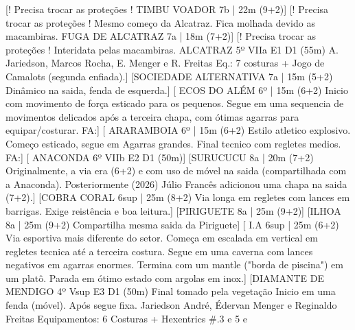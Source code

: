 
\begin{CGSectorRoutes}
    [! Precisa trocar as proteções ! TIMBU VOADOR 7b | 22m (9+2)]
    [! Precisa trocar as proteções ! Mesmo começo da Alcatraz. Fica molhada devido as macambiras. FUGA DE ALCATRAZ 7a | 18m (7+2)]
    [! Precisa trocar as proteções ! Interidata pelas macambiras. ALCATRAZ 5º VIIa E1 D1 (55m) A. Jariedson, Marcos Rocha, E. Menger e R. Freitas Eq.: 7 costuras + Jogo de Camalots (segunda enfiada).]
    [SOCIEDADE ALTERNATIVA 7a | 15m (5+2) Dinâmico na saida, fenda de esquerda.]
    [ ECOS DO ALÉM 6º | 15m (6+2) Inicio com movimento de força esticado para os pequenos. Segue em uma sequencia de movimentos delicados após a terceira chapa, com ótimas agarras para equipar/costurar. FA:]
    [ ARARAMBOIA 6º | 15m (6+2) Estilo atletico explosivo.
Começo esticado, segue em Agarras grandes. Final tecnico com regletes medios. FA:]
    [ ANACONDA 6º VIIb E2 D1 (50m)]
    [SURUCUCU 8a | 20m (7+2) Originalmente, a via era (6+2) e com uso de móvel na saida (compartilhada com a Anaconda). Posteriormente (2026) Júlio Francês adicionou uma chapa na saida (7+2).]
    [COBRA CORAL 6sup | 25m (8+2) Via longa em regletes com lances em barrigas. Exige reistência e boa leitura.]
    [PIRIGUETE 8a | 25m (9+2)]
    [ILHOA 8a | 25m (9+2) Compartilha mesma saida da Piriguete]
    [ I.A 6sup | 25m (6+2) Via esportiva mais diferente do setor. 
Começa em escalada em vertical em regletes tecnica até a terceira costura. Segue em uma caverna com lances negativos em agarras enormes. Termina com um mantle ("borda de piscina") em um platô. Parada em ótimo estado com argolas em inox.]
    [DIAMANTE DE MENDIGO 4º Vsup E3 D1 (50m) Final tomado pela vegetação Inicio em uma fenda (móvel). 
Após segue fixa. Jariedson André, Édervan Menger e Reginaldo Freitas Equipamentos: 
6 Costuras + 
Hexentrics \#.3 e 5 e 

\end{CGSectorRoutes}
